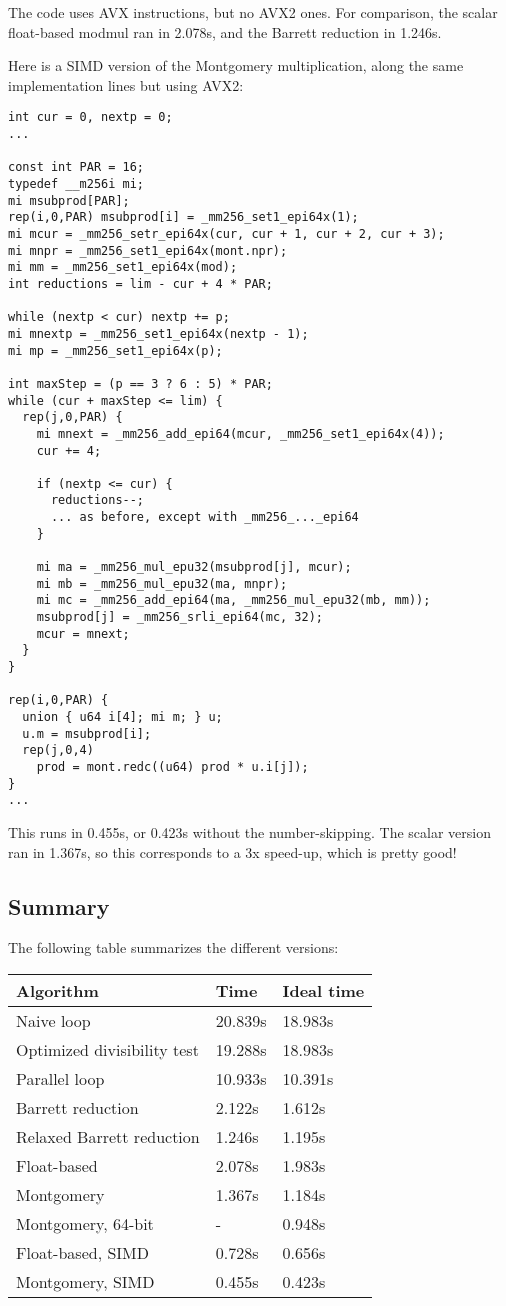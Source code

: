 The code uses AVX instructions, but no AVX2 ones.
For comparison, the scalar float-based modmul ran in 2.078s, and the Barrett reduction in 1.246s.

Here is a SIMD version of the Montgomery multiplication, along the same implementation lines but using AVX2:
\begin{lstlisting}
int cur = 0, nextp = 0;
...

const int PAR = 16;
typedef __m256i mi;
mi msubprod[PAR];
rep(i,0,PAR) msubprod[i] = _mm256_set1_epi64x(1);
mi mcur = _mm256_setr_epi64x(cur, cur + 1, cur + 2, cur + 3);
mi mnpr = _mm256_set1_epi64x(mont.npr);
mi mm = _mm256_set1_epi64x(mod);
int reductions = lim - cur + 4 * PAR;

while (nextp < cur) nextp += p;
mi mnextp = _mm256_set1_epi64x(nextp - 1);
mi mp = _mm256_set1_epi64x(p);

int maxStep = (p == 3 ? 6 : 5) * PAR;
while (cur + maxStep <= lim) {
  rep(j,0,PAR) {
    mi mnext = _mm256_add_epi64(mcur, _mm256_set1_epi64x(4));
    cur += 4;

    if (nextp <= cur) {
      reductions--;
      ... as before, except with _mm256_..._epi64
    }

    mi ma = _mm256_mul_epu32(msubprod[j], mcur);
    mi mb = _mm256_mul_epu32(ma, mnpr);
    mi mc = _mm256_add_epi64(ma, _mm256_mul_epu32(mb, mm));
    msubprod[j] = _mm256_srli_epi64(mc, 32);
    mcur = mnext;
  }
}

rep(i,0,PAR) {
  union { u64 i[4]; mi m; } u;
  u.m = msubprod[i];
  rep(j,0,4)
    prod = mont.redc((u64) prod * u.i[j]);
}
...
\end{lstlisting}

This runs in 0.455s, or 0.423s without the number-skipping.
The scalar version ran in 1.367s, so this corresponds to a 3x speed-up, which is pretty good!

\subsection{Summary}
The following table summarizes the different versions:

\vspace{1mm}
\noindent
\begin{tabular}{|l|l|l|}
\hline
Algorithm & Time & Ideal time \\
\hline
Naive loop & 20.839s & 18.983s \\
Optimized divisibility test & 19.288s & 18.983s \\
Parallel loop & 10.933s & 10.391s \\
Barrett reduction & 2.122s & 1.612s \\
Relaxed Barrett reduction & 1.246s & 1.195s \\
Float-based & 2.078s & 1.983s \\
Montgomery & 1.367s & 1.184s \\
Montgomery, 64-bit & - & 0.948s \\
Float-based, SIMD & 0.728s & 0.656s \\
Montgomery, SIMD & 0.455s & 0.423s \\
\hline
\end{tabular}
\vspace{1mm}

